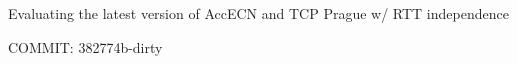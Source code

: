 	\def \plotsfolder {paper_prague}

Evaluating the latest version of AccECN and TCP Prague w/ RTT independence

	COMMIT: 382774b-dirty
